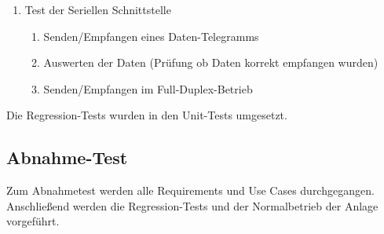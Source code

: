 \documentclass[oneside,a4paper,titlepage]{scrartcl} %
\begin{document}
\begin{enumerate}
  \newpage

  \item Test der Seriellen Schnittstelle
  \begin{enumerate}
    \item Senden/Empfangen eines Daten-Telegramms
    \item Auswerten der Daten (Prüfung ob Daten korrekt empfangen wurden)
    \item Senden/Empfangen im Full-Duplex-Betrieb
  \end{enumerate}
\end{enumerate}
Die Regression-Tests wurden in den Unit-Tests umgesetzt.

\subsection{Abnahme-Test}
Zum Abnahmetest werden alle Requirements und Use Cases durchgegangen. Anschließend werden
die Regression-Tests und der Normalbetrieb der Anlage vorgeführt.

\end{document}
